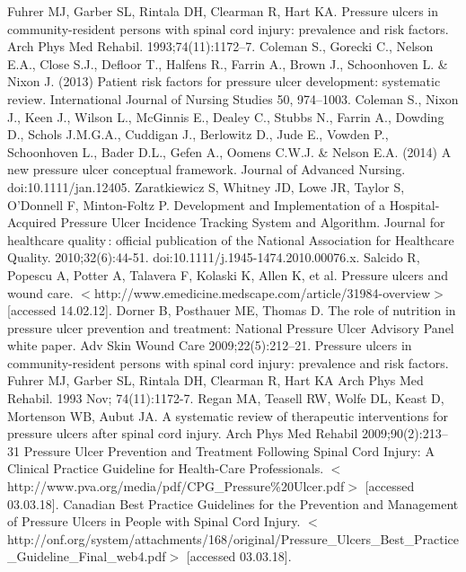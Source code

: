 \documentclass{amia}
\begin{document}
{\begin{thebibliography}{1}
Fuhrer MJ, Garber SL, Rintala DH, Clearman R, Hart KA. Pressure ulcers in community-resident persons with spinal cord injury: prevalence and risk factors. Arch Phys Med Rehabil. 1993;74(11):1172–7.
Coleman S., Gorecki C., Nelson E.A., Close S.J., Defloor T., Halfens R., Farrin A., Brown J., Schoonhoven L. \& Nixon J. (2013) Patient risk factors for pressure ulcer development: systematic review. International Journal of Nursing Studies 50, 974–1003.
Coleman S., Nixon J., Keen J., Wilson L., McGinnis E., Dealey C., Stubbs N., Farrin A., Dowding D., Schols J.M.G.A., Cuddigan J., Berlowitz D., Jude E., Vowden P., Schoonhoven L., Bader D.L., Gefen A., Oomens C.W.J. \& Nelson E.A. (2014) A new pressure ulcer conceptual framework. Journal of Advanced Nursing. doi:10.1111/jan.12405.
Zaratkiewicz S, Whitney JD, Lowe JR, Taylor S, O’Donnell F, Minton-Foltz P. Development and Implementation of a Hospital-Acquired Pressure Ulcer Incidence Tracking System and Algorithm. Journal for healthcare quality : official publication of the National Association for Healthcare Quality. 2010;32(6):44-51. doi:10.1111/j.1945-1474.2010.00076.x.
Salcido R, Popescu A, Potter A, Talavera F, Kolaski K, Allen K, et al. Pressure ulcers and wound care. $<$http://www.emedicine.medscape.com/article/31984-overview$>$ [accessed 14.02.12]. 
Dorner B, Posthauer ME, Thomas D. The role of nutrition in pressure ulcer prevention and treatment: National Pressure Ulcer Advisory Panel white paper. Adv Skin Wound Care 2009;22(5):212–21.
Pressure ulcers in community-resident persons with spinal cord injury: prevalence and risk factors.
Fuhrer MJ, Garber SL, Rintala DH, Clearman R, Hart KA
Arch Phys Med Rehabil. 1993 Nov; 74(11):1172-7.
Regan MA, Teasell RW, Wolfe DL, Keast D, Mortenson WB, Aubut JA. A systematic review of therapeutic interventions for pressure ulcers after spinal cord injury. Arch Phys Med Rehabil 2009;90(2):213–31
Pressure Ulcer Prevention and Treatment Following Spinal Cord Injury: A Clinical Practice Guideline for Health-Care Professionals. $<$http://www.pva.org/media/pdf/CPG\_Pressure\%20Ulcer.pdf$>$ [accessed 03.03.18].
Canadian Best Practice Guidelines for the Prevention and Management of Pressure Ulcers in People with Spinal Cord Injury. $<$http://onf.org/system/attachments/168/original/Pressure\_Ulcers\_Best\_Practice\_Guideline\_Final\_web4.pdf$>$ [accessed 03.03.18].

\end{thebibliography}}
\end{document}
